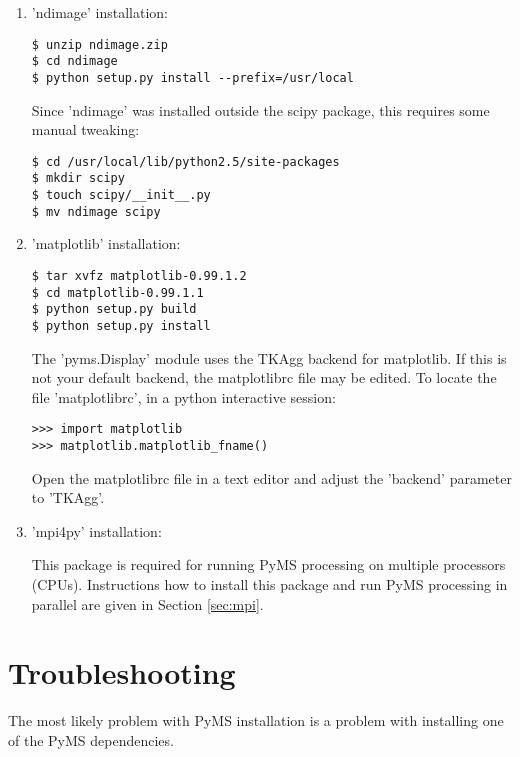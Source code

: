 \begin{enumerate}
\item 'ndimage' installation:

\begin{verbatim}
$ unzip ndimage.zip
$ cd ndimage
$ python setup.py install --prefix=/usr/local
\end{verbatim}

\noindent
Since 'ndimage' was installed outside the scipy package, this requires
some manual tweaking:

\begin{verbatim}
$ cd /usr/local/lib/python2.5/site-packages
$ mkdir scipy
$ touch scipy/__init__.py
$ mv ndimage scipy
\end{verbatim}

\item 'matplotlib' installation:

\begin{verbatim}
$ tar xvfz matplotlib-0.99.1.2
$ cd matplotlib-0.99.1.1
$ python setup.py build
$ python setup.py install
\end{verbatim}

\noindent
The 'pyms.Display' module uses the TKAgg backend for matplotlib. If
this is not your default backend, the matplotlibrc file may be edited.
To locate the file 'matplotlibrc', in a python interactive session:

\begin{verbatim}
>>> import matplotlib
>>> matplotlib.matplotlib_fname()
\end{verbatim}

\noindent
Open the matplotlibrc file in a text editor and adjust the 'backend'
parameter to 'TKAgg'.

\item 'mpi4py' installation:

This package is required for running PyMS processing on multiple processors
(CPUs). Instructions how to install this package and run PyMS processing
in parallel are given in Section \ref{sec:mpi}. 

\end{enumerate}


\section{Troubleshooting}

The most likely problem with PyMS installation is a problem with
installing one of the PyMS dependencies.

